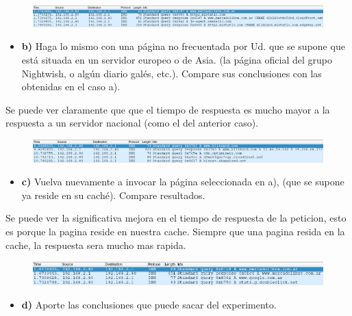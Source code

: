 \documentclass[12pt]{extarticle}
\makeatletter
\def\maxwidth{\ifdim\Gin@nat@width>\linewidth\linewidth
    \else\Gin@nat@width\fi}
\let\Oldincludegraphics\includegraphics
\renewcommand{\includegraphics}[1]{\Oldincludegraphics[width=.8\maxwidth]{#1}}
\providecommand{\tightlist}{%
      \setlength{\itemsep}{0pt}\setlength{\parskip}{0pt}}
\makeatother
\begin{document}
\begin{figure}[h]
\centering
\includegraphics{images/server_nacional.png}
\caption{}
\end{figure}

\begin{itemize}
\tightlist
\item
  \textbf{b)} Haga lo mismo con una página no frecuentada por Ud. que se
  supone que está situada en un servidor europeo o de Asia. (la página
  oficial del grupo Nightwish, o algún diario galés, etc.). Compare sus
  conclusiones con las obtenidas en el caso a).
\end{itemize}

Se puede ver claramente que que el tiempo de respuesta es mucho mayor a
la respuesta a un servidor nacional (como el del anterior caso).

\begin{figure}[h]
\centering
\includegraphics{images/server_externo.png}
\caption{}
\end{figure}

\begin{itemize}
\tightlist
\item
  \textbf{c)} Vuelva nuevamente a invocar la página seleccionada en a),
  (que se supone ya reside en su caché). Compare resultados.
\end{itemize}

Se puede ver la significativa mejora en el tiempo de respuesta de la
peticion, esto es porque la pagina reside en nuestra cache. Siempre que
una pagina resida en la cache, la respuesta sera mucho mas rapida.

\begin{figure}[h]
\centering
\includegraphics{images/cacheada.png}
\caption{}
\end{figure}

\begin{itemize}
\tightlist
\item
  \textbf{d)} Aporte las conclusiones que puede sacar del experimento.
\end{itemize}
\end{document}
